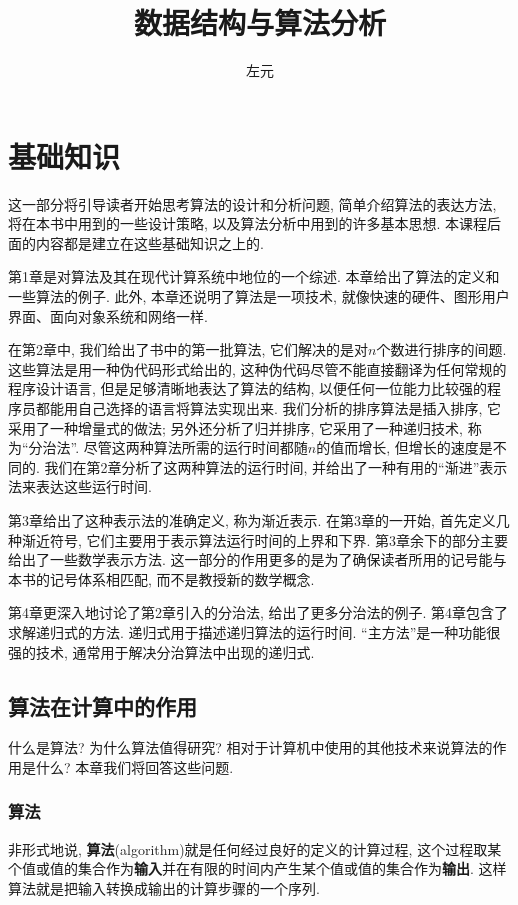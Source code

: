 \documentclass[oneside,10pt,fontset=none]{ctexbook}
\title{数据结构与算法分析}
\author{左元}
\begin{document}
\maketitle
\tableofcontents

\part{基础知识}

这一部分将引导读者开始思考算法的设计和分析问题, 简单介绍算法的表达方法, 将在本书中用到的一些设计策略, 以及算法分析中用到的许多基本思想. 本课程后面的内容都是建立在这些基础知识之上的.

第1章是对算法及其在现代计算系统中地位的一个综述. 本章给出了算法的定义和一些算法的例子. 此外, 本章还说明了算法是一项技术, 就像快速的硬件、图形用户界面、面向对象系统和网络一样.

在第2章中, 我们给出了书中的第一批算法, 它们解决的是对$n$个数进行排序的间题. 这些算法是用一种伪代码形式给出的, 这种伪代码尽管不能直接翻译为任何常规的程序设计语言, 但是足够清晰地表达了算法的结构, 以便任何一位能力比较强的程序员都能用自己选择的语言将算法实现出来. 我们分析的排序算法是插入排序, 它采用了一种增量式的做法; 另外还分析了归并排序, 它采用了一种递归技术, 称为``分治法''. 尽管这两种算法所需的运行时间都随$n$的值而增长, 但增长的速度是不同的. 我们在第2章分析了这两种算法的运行时间, 并给出了一种有用的``渐进''表示法来表达这些运行时间.

第3章给出了这种表示法的准确定义, 称为渐近表示. 在第3章的一开始, 首先定义几种渐近符号, 它们主要用于表示算法运行时间的上界和下界. 第3章余下的部分主要给出了一些数学表示方法. 这一部分的作用更多的是为了确保读者所用的记号能与本书的记号体系相匹配, 而不是教授新的数学概念.

第4章更深入地讨论了第2章引入的分治法, 给出了更多分治法的例子. 第4章包含了求解递归式的方法. 递归式用于描述递归算法的运行时间. ``主方法''是一种功能很强的技术, 通常用于解决分治算法中出现的递归式.

\chapter{算法在计算中的作用}

什么是算法? 为什么算法值得研究? 相对于计算机中使用的其他技术来说算法的作用是什么? 本章我们将回答这些问题.

\section{算法}

非形式地说, \textbf{算法}(algorithm)就是任何经过良好的定义的计算过程, 这个过程取某个值或值的集合作为\textbf{输入}并在有限的时间内产生某个值或值的集合作为\textbf{输出}. 这样算法就是把输入转换成输出的计算步骤的一个序列.
\end{document}
